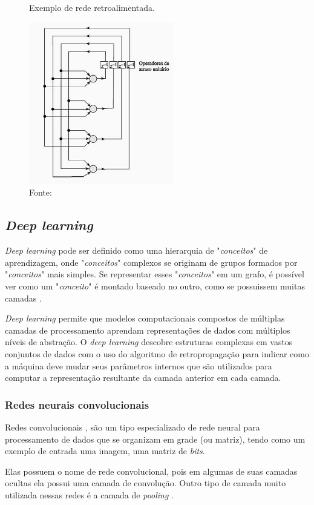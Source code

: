 \begin{itemize}
\begin{figure}[H]
  \centering
  \caption{Exemplo de rede retroalimentada.}
  \includegraphics[width=180pt]{dados/figuras/retroalimentacao}
  \caption*{Fonte: \cite{haykin2001}}
  \label{fig:retroalimentacao}
\end{figure}
\end{itemize}
\subsection{\textit{Deep learning}}
\textit{Deep learning} pode ser definido como uma hierarquia de "\textit{conceitos}" de aprendizagem, onde "\textit{conceitos}" complexos se originam de grupos formados por "\textit{conceitos}" mais simples. Se representar esses "\textit{conceitos}" em um grafo, é possível ver como um "\textit{conceito}" é montado baseado no outro, como se possuissem muitas camadas \cite{Goodfellow-et-al-2016}.

\begin{citacao}
    \textit{Deep learning} permite que modelos computacionais compostos de múltiplas camadas de processamento aprendam representações de dados com múltiplos níveis de abstração.
   O  \textit{deep learning} descobre estruturas complexas em vastos conjuntos de dados com o uso do algoritmo de retropropagação para indicar como a máquina deve mudar seus parâmetros internos que são utilizados para computar a representação resultante da camada anterior em cada camada.\cite{lecun2015deep}
\end{citacao}

\subsubsection{Redes neurais convolucionais}
Redes convolucionais \cite{lecun1989backpropagation}, são um tipo especializado de rede neural para processamento de dados que se organizam em grade (ou matriz), tendo como um exemplo de entrada uma imagem, uma matriz de \textit{bits}.
\par Elas possuem o nome de rede convolucional, pois em algumas de suas camadas ocultas ela possui uma camada de convolução. Outro tipo de camada muito utilizada nessas redes é a camada de \textit{pooling} \cite{Goodfellow-et-al-2016}.
